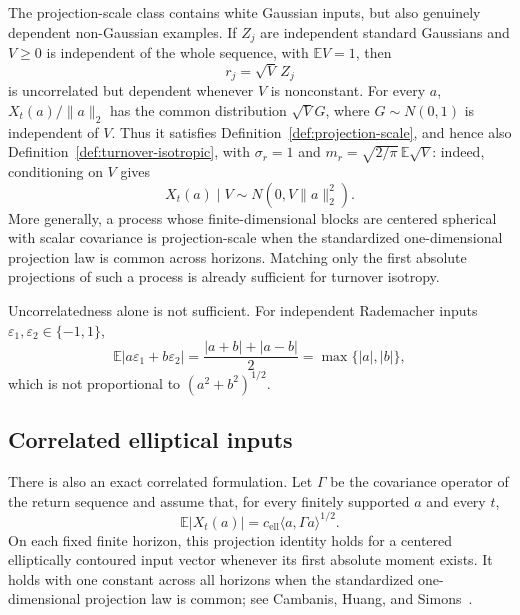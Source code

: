 \documentclass[11pt]{amsart}
\theoremstyle{definition}
\theoremstyle{remark}
\begin{document}
The projection-scale class contains white Gaussian inputs, but also genuinely
dependent non-Gaussian examples. If $Z_j$ are independent standard Gaussians and
$V\geq0$ is independent of the whole sequence, with $\mathbb E V=1$, then
\[
 r_j=\sqrt V\,Z_j
\]
is uncorrelated but dependent whenever $V$ is nonconstant. For every $a$,
$X_t(a)/\|a\|_2$ has the common distribution $\sqrt V G$, where
$G\sim N(0,1)$ is independent of $V$. Thus it satisfies
Definition~\ref{def:projection-scale}, and hence also
Definition~\ref{def:turnover-isotropic}, with
$\sigma_r=1$ and
$m_r=\sqrt{2/\pi}\,\mathbb E\sqrt V$: indeed, conditioning on $V$ gives
\[
 X_t(a)\mid V\sim N(0,V\|a\|_2^2).
\]
More generally, a process whose finite-dimensional blocks are centered
spherical with scalar covariance is projection-scale when the standardized
one-dimensional projection law is common across horizons. Matching only the
first absolute projections of such a process is already sufficient for
turnover isotropy.

Uncorrelatedness alone is not sufficient. For independent Rademacher inputs
$\varepsilon_1,\varepsilon_2\in\{-1,1\}$,
\[
 \mathbb E|a\varepsilon_1+b\varepsilon_2|
 =\frac{|a+b|+|a-b|}{2}
 =\max\{|a|,|b|\},
\]
which is not proportional to $(a^2+b^2)^{1/2}$.

\subsection{Correlated elliptical inputs}
There is also an exact correlated formulation. Let $\Gamma$ be the covariance
operator of the return sequence and assume that, for every finitely supported
$a$ and every $t$,
\begin{equation}\label{eq:elliptical-projection}
 \mathbb E|X_t(a)|=c_{\mathrm{ell}}
 \langle a,\Gamma a\rangle^{1/2}.
\end{equation}
On each fixed finite horizon, this projection identity holds for a centered
elliptically contoured input vector whenever its first absolute moment exists.
It holds with one constant across all horizons when the standardized
one-dimensional projection law is common; see Cambanis, Huang, and
Simons~\cite{CambanisElliptical}.
\end{document}
